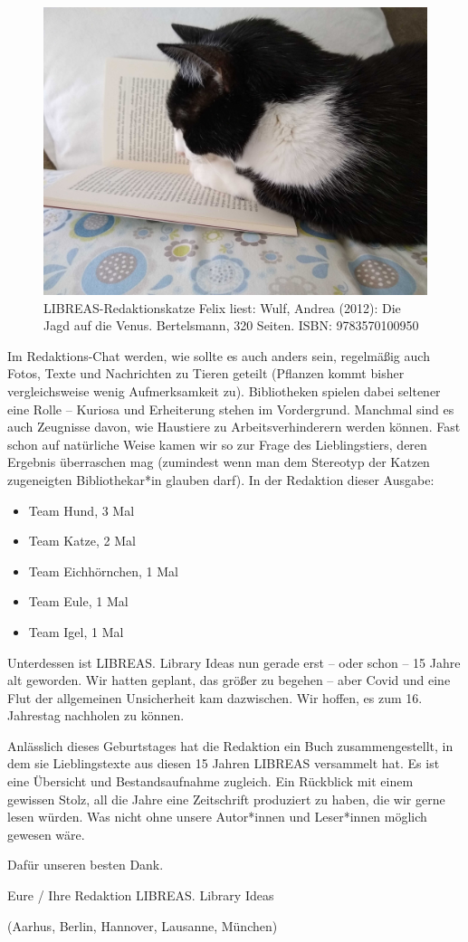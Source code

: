 \documentclass[a4paper,
fontsize=11pt,
oneside,
numbers=noperiodatend,
parskip=half-,
bibliography=totoc,
final
]{scrartcl}
\begin{document}
\begin{figure}
\centering
\includegraphics{img/felix-liest.jpg}
\caption{LIBREAS-Redaktionskatze Felix liest: Wulf, Andrea (2012): Die
Jagd auf die Venus. Bertelsmann, 320 Seiten. ISBN: 9783570100950}
\end{figure}

Im Redaktions-Chat werden, wie sollte es auch anders sein, regelmäßig
auch Fotos, Texte und Nachrichten zu Tieren geteilt (Pflanzen kommt
bisher vergleichsweise wenig Aufmerksamkeit zu). Bibliotheken spielen
dabei seltener eine Rolle -- Kuriosa und Erheiterung stehen im
Vordergrund. Manchmal sind es auch Zeugnisse davon, wie Haustiere zu
Arbeitsverhinderern werden können. Fast schon auf natürliche Weise kamen
wir so zur Frage des Lieblingstiers, deren Ergebnis überraschen mag
(zumindest wenn man dem Stereotyp der Katzen zugeneigten Bibliothekar*in
glauben darf). In der Redaktion dieser Ausgabe:

\begin{itemize}
\tightlist
\item
  Team Hund, 3 Mal
\item
  Team Katze, 2 Mal
\item
  Team Eichhörnchen, 1 Mal
\item
  Team Eule, 1 Mal
\item
  Team Igel, 1 Mal
\end{itemize}


Unterdessen ist LIBREAS. Library Ideas nun gerade erst -- oder schon --
15 Jahre alt geworden. Wir hatten geplant, das größer zu begehen -- aber
Covid und eine Flut der allgemeinen Unsicherheit kam dazwischen. Wir
hoffen, es zum 16. Jahrestag nachholen zu können.

Anlässlich dieses Geburtstages hat die Redaktion ein Buch
zusammengestellt, in dem sie Lieblingstexte aus diesen 15 Jahren LIBREAS
versammelt hat. Es ist eine Übersicht und Bestandsaufnahme zugleich. Ein
Rückblick mit einem gewissen Stolz, all die Jahre eine Zeitschrift
produziert zu haben, die wir gerne lesen würden. Was nicht ohne unsere
Autor*innen und Leser*innen möglich gewesen wäre.

Dafür unseren besten Dank.

Eure / Ihre Redaktion LIBREAS. Library Ideas

(Aarhus, Berlin, Hannover, Lausanne, München)

\end{document}
